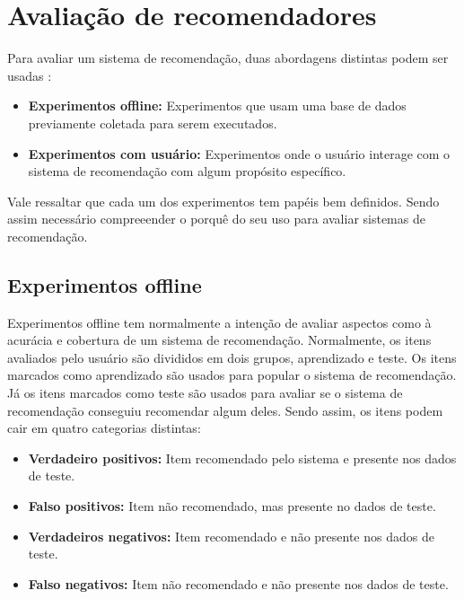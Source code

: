 \section{Avaliação de recomendadores}

Para avaliar um sistema de recomendação, duas abordagens distintas podem ser
usadas \cite{herlocker2004evaluating}:

\begin{itemize}
    \item \textbf{Experimentos offline: } Experimentos que usam uma base de
        dados previamente coletada para serem executados.
    \item \textbf{Experimentos com usuário: } Experimentos onde o usuário
        interage com o sistema de recomendação com algum propósito específico.
\end{itemize}

Vale ressaltar que cada um dos experimentos tem papéis bem definidos. Sendo
assim necessário compreeender o porquê do seu uso para avaliar sistemas de
recomendação.

\subsection{Experimentos offline}

Experimentos offline tem normalmente a intenção de avaliar aspectos como à
acurácia e cobertura de um sistema de recomendação. Normalmente, os itens
avaliados pelo usuário são divididos em dois grupos, aprendizado e teste. Os
itens marcados como aprendizado são usados para popular o sistema de
recomendação. Já os itens marcados como teste são usados para avaliar se o
sistema de recomendação conseguiu recomendar algum deles. Sendo assim, os itens
podem cair em quatro categorias distintas:

\begin{itemize}
    \item \textbf{Verdadeiro positivos: } Item recomendado pelo sistema e
        presente nos dados de teste.
    \item \textbf{Falso positivos: } Item não recomendado, mas presente no dados
        de teste.
    \item \textbf{Verdadeiros negativos: } Item recomendado e não presente
        nos dados de teste.
    \item \textbf{Falso negativos: } Item não recomendado e não presente nos
        dados de teste.
\end{itemize}

